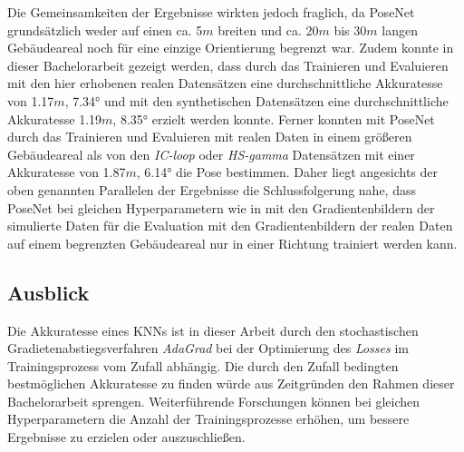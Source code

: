







Die Gemeinsamkeiten der Ergebnisse wirkten jedoch fraglich, da PoseNet grundsätzlich weder auf einen ca. 5$m$ breiten und ca. 20$m$ bis 30$m$ langen Gebäudeareal noch für eine einzige Orientierung begrenzt war. Zudem konnte in dieser Bachelorarbeit gezeigt werden, dass durch das Trainieren und Evaluieren mit den hier erhobenen realen Datensätzen eine durchschnittliche Akkuratesse von 1.17$m$, 7.34° und mit den synthetischen Datensätzen eine durchschnittliche Akkuratesse 1.19$m$, 8.35° erzielt werden konnte. Ferner konnten \citet{walchImageBasedLocalizationUsing2017} mit PoseNet durch das Trainieren und Evaluieren mit realen Daten in einem größeren Gebäudeareal als von den \textit{IC-loop} oder \textit{HS-gamma} Datensätzen mit einer Akkuratesse von 1.87$m$, 6.14° die Pose bestimmen. Daher liegt angesichts der oben genannten Parallelen der Ergebnisse die Schlussfolgerung nahe, dass PoseNet bei gleichen Hyperparametern wie in \cite{acharyaBIMPoseNetIndoorCamera2019} mit den Gradientenbildern der simulierte Daten für die Evaluation mit den Gradientenbildern der realen Daten auf einem begrenzten Gebäudeareal nur in einer Richtung trainiert werden kann.






 






\subsection{Ausblick}

Die Akkuratesse eines KNNs ist in dieser Arbeit durch den stochastischen Gradietenabstiegsverfahren \textit{AdaGrad} bei der Optimierung des \textit{Losses} im Trainingsprozess vom Zufall abhängig. Die durch den Zufall bedingten bestmöglichen Akkuratesse zu finden würde aus Zeitgründen den Rahmen dieser Bachelorarbeit sprengen. Weiterführende Forschungen können bei gleichen Hyperparametern die Anzahl der Trainingsprozesse erhöhen, um bessere Ergebnisse zu erzielen oder auszuschließen.

